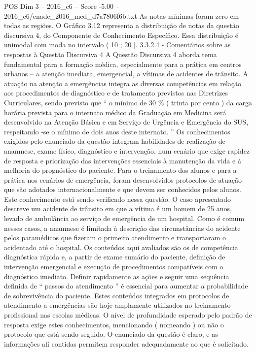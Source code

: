 \begin{textsample}{POS Dim 3 – 2016\_c6 – Score -5.00 – 2016\_c6/enade\_2016\_med\_d7a7806f6b.txt}
As notas mínimas foram zero em todas as regiões.
O Gráfico 3.12 representa a distribuição de notas da questão discursiva 4, do Componente de Conhecimento Específico.
Essa distribuição é unimodal com moda no intervalo ( 10 ; 20 ]. 3.3.2.4 - Comentários sobre as respostas à Questão Discursiva 4 A Questão Discursiva 4 aborda tema fundamental para a formação médica, especialmente para a prática em centros urbanos – a atenção imediata, emergencial, a vítimas de acidentes de trânsito.
A atuação na atenção a emergências integra as diversas competências em relação aos procedimentos de diagnóstico e de tratamento previstos nas Diretrizes Curriculares, sendo previsto que “ o mínimo de 30 \% ( trinta por cento ) da carga horária prevista para o internato médico da Graduação em Medicina será desenvolvido na Atenção Básica e em Serviço de Urgência e Emergência do SUS, respeitando -se o mínimo de dois anos deste internato. ” Os conhecimentos exigidos pelo enunciado da questão integram habilidades de realização de anamnese, exame físico, diagnóstico e intervenção, num cenário que exige rapidez de resposta e priorização das intervenções essenciais à manutenção da vida e à melhoria do prognóstico do paciente.
Para o treinamento dos alunos e para a prática nos cenários de emergência, foram desenvolvidos protocolos de atuação que são adotados internacionalmente e que devem ser conhecidos pelos alunos.
Este conhecimento está sendo verificado nessa questão.
O caso apresentado descreve um acidente de trânsito em que a vítima é um homem de 25 anos, levado de ambulância ao serviço de emergência de um hospital.
Como é comum nesses casos, a anamnese é limitada à descrição das circunstâncias do acidente pelos paramédicos que fizeram o primeiro atendimento e transportaram o acidentado até o hospital.
Os conteúdos aqui avaliados são os de competência diagnóstica rápida e, a partir de exame sumário do paciente, definição de intervenção emergencial e execução de procedimentos compatíveis com o diagnóstico imediato.
Definir rapidamente as ações e seguir uma sequência definida de “ passos do atendimento ” é essencial para aumentar a probabilidade de sobrevivência do paciente.
Estes conteúdos integrados em protocolos de atendimento a emergências são hoje amplamente utilizados no treinamento profissional nas escolas médicas.
O nível de profundidade esperado pelo padrão de resposta exige estes conhecimentos, mencionando ( nomeando ) ou não o protocolo que está sendo seguido.
O enunciado da questão é claro, e as informações ali contidas permitem responder adequadamente ao que é solicitado.

\end{textsample}
